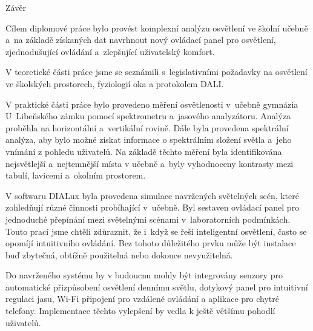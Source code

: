 \nonum\chap Závěr

Cílem diplomové práce bylo provést komplexní analýzu osvětlení ve školní učebně a~na základě získaných dat
navrhnout nový ovládací panel pro osvětlení, zjednodušující ovládání a~zlepšující uživatelský komfort.

V teoretické části práce jsme se seznámili s~legislativními požadavky na osvětlení ve školských prostorech,
fyziologií oka a protokolem DALI.

V praktické části práce bylo provedeno měření osvětlenosti v~učebně gymnázia U~Libeňského zámku pomocí spektrometru
a~jasového analyzátoru. Analýza proběhla na horizontální a~vertikální rovině. Dále byla provedena spektrální analýza,
aby bylo možné získat informace o spektrálním složení světla a~jeho vnímání z pohledu uživatelů. Na základě těchto měření
byla identifikována nejsvětlejší a~nejtemnější místa v učebně a~byly vyhodnoceny kontrasty mezi tabulí, lavicemi
a~okolním prostorem.

V softwaru DIALux byla provedena simulace navržených světelných scén, které zohledňují různé činnosti probíhající v~učebně.
Byl sestaven ovládací panel pro jednoduché přepínání mezi světelnými scénami v~laboratorních podmínkách.
Touto prací jsme chtěli zdůraznit, že i~když se řeší inteligentní osvětlení, často se opomíjí
intuitivního ovládání. Bez tohoto důležitého prvku může být instalace buď zbytečná, obtížně použitelná nebo dokonce nevyužitelná.

Do navrženého systému by v budoucnu mohly být integrovány senzory pro automatické přizpůsobení osvětlení dennímu světlu,
dotykový panel pro intuitivní regulaci jasu, Wi-Fi připojení pro vzdálené ovládání a aplikace pro chytré telefony.
Implementace těchto vylepšení by vedla k ještě většímu pohodlí uživatelů.
















